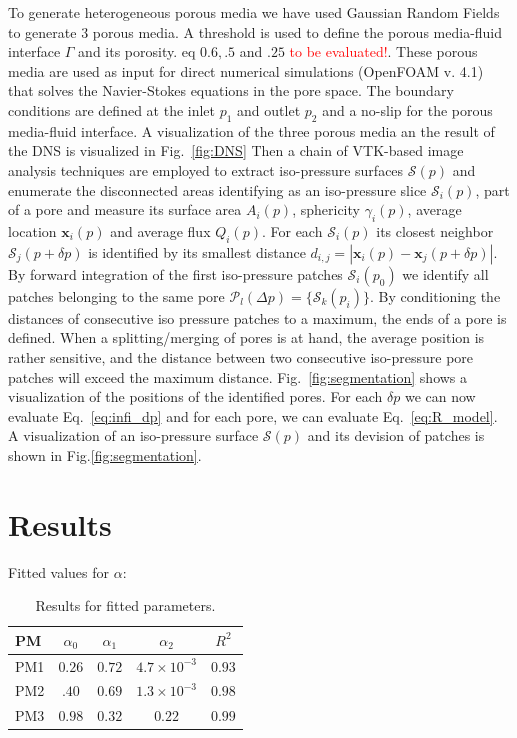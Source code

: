 \documentclass[draft]{agujournal2019}
\newcommand{\markred}[1]{\textcolor{red}{#1}}
\begin{document}
To generate heterogeneous porous media we have used Gaussian Random Fields to generate 3 porous media. A threshold is used to define the porous media-fluid interface $\Gamma$ and its porosity. eq $0.6, .5 $ and $.25$ \markred{to be evaluated!}. 
These porous media are used as input for direct numerical simulations (OpenFOAM v. 4.1)   that solves the Navier-Stokes equations in the pore space. The boundary conditions are defined at the inlet $p_1$ and outlet $p_2$ and a no-slip for the porous media-fluid interface. A visualization of the three porous media an the result of the DNS is visualized in Fig.~\ref{fig:DNS}
Then a chain of VTK-based image analysis techniques  are employed to extract iso-pressure surfaces $\mathcal{S}(p)$ and enumerate the disconnected areas identifying as an iso-pressure slice $\mathcal{S}_i(p)$, part of a pore and measure its surface area $A_i(p)$, sphericity $\gamma_i(p)$, average location $\mathbf{x}_i(p)$ and average flux $Q_i(p)$. For each $\mathcal{S}_i(p)$ its closest neighbor $\mathcal{S}_j(p+\delta p)$ is identified by its smallest distance $d_{i,j}= \left|  \mathbf{x}_i(p)-\mathbf{x}_j(p+\delta p)\right|$. By forward integration of the first iso-pressure patches $\mathcal{S}_i(p_0)$ we identify all patches belonging to the same pore $\mathcal{P}_l(\Delta p) = \{\mathcal{S}_k(p_i)\}$. By conditioning the distances of consecutive iso pressure patches to a maximum, the ends of a pore is defined. When a splitting/merging of pores is at hand, the average position is rather sensitive, and the distance between two consecutive iso-pressure pore patches will exceed the maximum distance. Fig.~\ref{fig:segmentation} shows a visualization of the positions of the identified pores. For each $\delta p$ we can now evaluate Eq.~\ref{eq:infi_dp} and for each pore, we can evaluate Eq.~\ref{eq:R_model}. A visualization of an iso-pressure surface $\mathcal{S}(p)$ and its devision of patches is shown in Fig.\ref{fig:segmentation}. 



\section{Results} 
Fitted values for $\alpha $:

\begin{table}[htbp!]
\centering
\begin{tabular}{l|c|c|c|c}
PM & $\alpha_0$ & $\alpha_1$ & $\alpha_2$ & $R^2$  \\
\hline
PM1 & $0.26$ & $0.72$ & $4.7\times 10^{-3}$ &  $0.93$\\
PM2 & $.40$ & $0.69$ & $1.3 \times 10^{-3}$ & $0.98$ \\
PM3 & $0.98$ & $0.32$ & $0.22$ & $0.99$ \\
\end{tabular}
\caption{\label{tab:table-name}Results for fitted parameters.}
\end{table}
\end{document}
